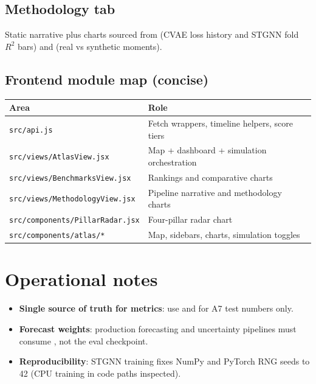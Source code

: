 \documentclass[11pt,a4paper]{article}
\begin{document}
\subsection{Methodology tab}
Static narrative plus charts sourced from  (CVAE loss history and STGNN fold $R^2$ bars) and  (real vs synthetic moments).

\subsection{Frontend module map (concise)}
\begin{center}
\small
\begin{tabular}{@{}lp{9cm}@{}}
  \toprule
  \textbf{Area} & \textbf{Role} \\
  \midrule
  \texttt{src/api.js} & Fetch wrappers, timeline helpers, score tiers \\
  \texttt{src/views/AtlasView.jsx} & Map + dashboard + simulation orchestration \\
  \texttt{src/views/BenchmarksView.jsx} & Rankings and comparative charts \\
  \texttt{src/views/MethodologyView.jsx} & Pipeline narrative and methodology charts \\
  \texttt{src/components/PillarRadar.jsx} & Four-pillar radar chart \\
  \texttt{src/components/atlas/*} & Map, sidebars, charts, simulation toggles \\
  \bottomrule
\end{tabular}
\end{center}

\section{Operational notes}
\begin{itemize}
  \item \textbf{Single source of truth for metrics}: use  and  for A7 test numbers only.
  \item \textbf{Forecast weights}: production forecasting and uncertainty pipelines must consume , not the eval checkpoint.
  \item \textbf{Reproducibility}: STGNN training fixes NumPy and PyTorch RNG seeds to 42 (CPU training in code paths inspected).
\end{itemize}
\end{document}
